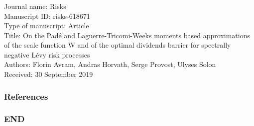 \documentclass[xcolor=pdftex,dvipsnames,table]{beamer}
\theoremstyle{definition}
\begin{document}
\begin{frame}
\frametitle{\insertsectionhead}
Journal name: Risks\\
Manuscript ID: risks-618671\\
Type of manuscript: Article\\
Title: On the Pad\'e and Laguerre-Tricomi-Weeks moments based approximations of the scale function W and of the optimal dividends barrier for spectrally negative L\'evy risk processes\\
Authors: Florin Avram, Andras Horvath, Serge Provost, Ulyses Solon\\
Received: 30 September 2019
\end{frame}

\begin{frame}
\frametitle{References}


\end{frame}

\begin{frame}
\frametitle{END}
\end{frame}
\end{document}
